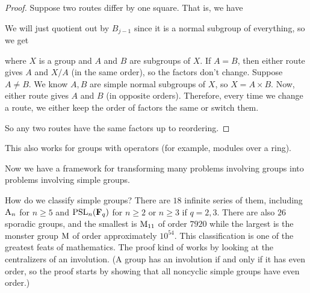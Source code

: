 \documentclass[11pt, oneside]{amsart}
\begin{document}
\begin{proof}
Suppose two routes differ by one square. That is, we have 
\begin{center}
\end{center}
We will just quotient out by $B_{j-1}$ since it is a normal subgroup of everything, so we get 
\begin{center}
\end{center}
where $X$ is a group and $A$ and $B$ are subgroups of $X$. If $A=B$, then either route gives $A$ and $X/A$ (in the same order), so the factors don't change. Suppose $A\ne B$. We know $A, B$ are simple normal subgroups of $X$, so $X = A\times B$. Now, either route gives $A$ and $B$ (in opposite orders). Therefore, every time we change a route, we either keep the order of factors the same or switch them. 

So any two routes have the same factors up to reordering. 
\end{proof}
This also works for groups with operators (for example, modules over a ring).

Now we have a framework for transforming many problems involving groups into problems involving simple groups. 

How do we classify simple groups? There are $18$ infinite series of them, including $\operatorname{A}_n$ for $n\ge 5$ and $\operatorname{PSL}_n(\mathbf F_q)$ for $n\ge 2$ or $n\ge 3$ if $q=2,3$. There are also $26$ sporadic groups, and the smallest is $\operatorname{M}_{11}$ of order $7920$ while the largest is the monster group $\operatorname{M}$ of order approximately $10^{54}$. This classification is one of the greatest feats of mathematics. The proof kind of works by looking at the centralizers of an involution. (A group has an involution if and only if it has even order, so the proof starts by showing that all noncyclic simple groups have even order.)
\end{document}
